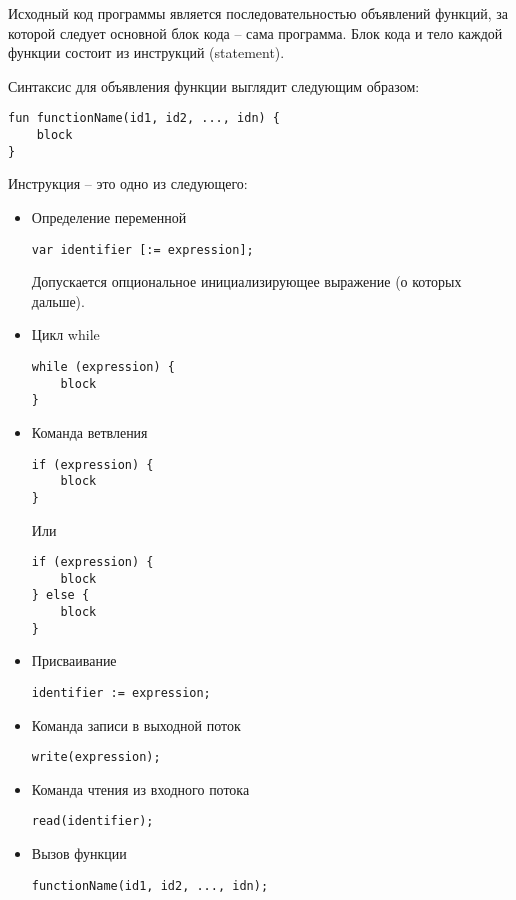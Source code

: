 Исходный код программы является последовательностью объявлений функций, за
которой следует основной блок кода -- сама программа.
Блок кода и тело каждой функции состоит из инструкций (statement).

Синтаксис для объявления функции выглядит следующим образом:
\begin{lstlisting}
fun functionName(id1, id2, ..., idn) {
    block
}
\end{lstlisting}

Инструкция -- это одно из следующего:
\begin{itemize}
    \item Определение переменной
\begin{lstlisting}
var identifier [:= expression];
\end{lstlisting}
    Допускается опциональное инициализирующее выражение (о которых дальше).\\
    
    \item Цикл while
\begin{lstlisting}
while (expression) {
    block
}
\end{lstlisting}
    
    \item Команда ветвления
\begin{lstlisting}
if (expression) {
    block
}
\end{lstlisting}
    Или
\begin{lstlisting}
if (expression) {
    block
} else {
    block
}
\end{lstlisting}
    
    \item Присваивание
\begin{lstlisting}
identifier := expression;
\end{lstlisting}
    
    \item Команда записи в выходной поток
\begin{lstlisting}
write(expression);
\end{lstlisting}

    \item Команда чтения из входного потока
\begin{lstlisting}
read(identifier);
\end{lstlisting}

    \item Вызов функции
\begin{lstlisting}
functionName(id1, id2, ..., idn);
\end{lstlisting}
\end{itemize}


